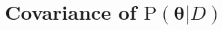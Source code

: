 \documentclass[12pt]{report}
\begin{document}
%
%
%
%
%
%
%



\section{Covariance of $\text{P}(\bm{\theta}|D)$} \label{app:cov_theta_D}
\end{document}
